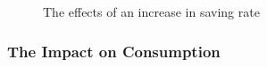 \documentclass[12pt]{article} %
\begin{document}
\begin{figure}[H] %
	\caption{\small The effects of an increase in saving rate}
	\label{fig:speciation}
\end{figure}

\subsubsection{The Impact on Consumption}
\end{document}
